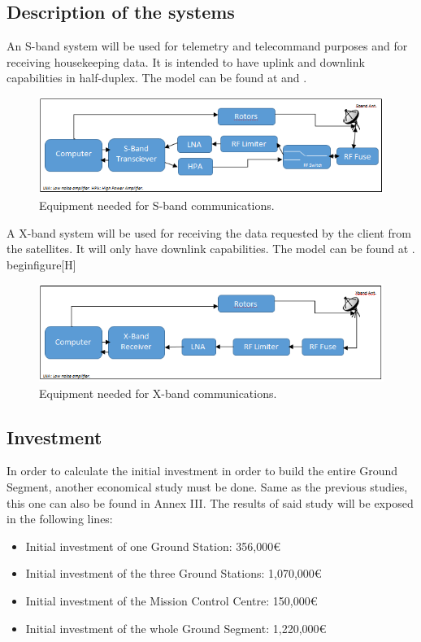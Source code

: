 \subsection{Description of the systems}
An S-band system will be used for telemetry and telecommand purposes and for receiving housekeeping data. It is intended to have uplink and downlink capabilities in half-duplex. The model can be found at \cite{SBand} and \cite{SBandDatasheet}.
\begin{figure}[H]
\begin{center}
\includegraphics[scale=1]{SbandEquip.PNG}
\caption[S-band Equipment]{Equipment needed for S-band communications.}
\label{fig:SbandEquip}
\end{center}
\end{figure}

A X-band system will be used for receiving the data requested by the client from the satellites. It will only have downlink capabilities. The model can be found at \cite{XBand}.
begin{figure}[H]
\begin{figure}[H]
\begin{center}
\includegraphics[scale=1]{XbandEquip.PNG}
\caption[X-band Equipment]{Equipment needed for X-band communications.}
\label{fig:XbandEquip}
\end{center}
\end{figure}

\subsection{Investment}
In order to calculate the initial investment in order to build the entire Ground Segment, another economical study must be done. Same as the previous studies, this one can also be found in Annex III. The results of said study will be exposed in the following lines:

\begin{itemize}
\item Initial investment of one Ground Station: 356,000\euro
\item Initial investment of the three Ground Stations: 1,070,000\euro
\item Initial investment of the Mission Control Centre: 150,000\euro
\item Initial investment of the whole Ground Segment: 1,220,000\euro
\end{itemize}